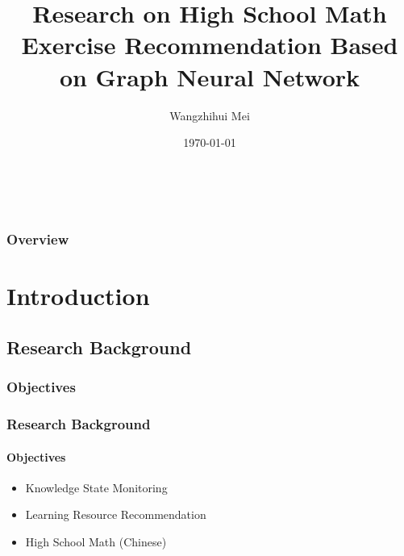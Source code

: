 \documentclass{beamer}
\title[Exercise Recommendation]{Research on High School Math Exercise Recommendation Based on Graph Neural Network} %
\author{Wangzhihui Mei} %
\institute[UOW] 
{
University of Wollongong \\ %
\medskip
\textit{maywzh@gmail.com} %
}
\date{\today} %
\begin{document}
\begin{frame}
  \titlepage\ %
\end{frame}

\begin{frame}
  \frametitle{Overview} %
  \tableofcontents %
\end{frame}


\section{Introduction}
\subsection{Research Background}
\subsubsection{Objectives}
\begin{frame}
  \frametitle{Research Background}
  \framesubtitle{Objectives}
  \begin{itemize}
    \item Knowledge State Monitoring
    \item Learning Resource Recommendation
    \item High School Math (Chinese)
  \end{itemize}
\end{frame}

\end{document}
